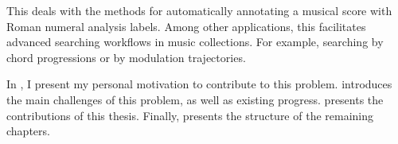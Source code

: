 

This \thesisdiss deals with the methods for automatically
annotating a musical score with Roman numeral analysis
labels. Among other applications, this facilitates advanced
searching workflows in music collections. For example,
searching by chord progressions or by modulation
trajectories.

In , I present my personal motivation to
contribute to this problem.  introduces
the main challenges of this problem, as well as existing
progress.  presents the
contributions of this thesis. Finally,
 presents the structure of the
remaining chapters.
